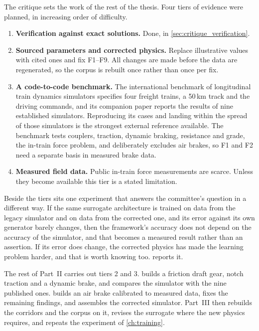 The critique sets the work of the rest of the thesis. Four tiers of evidence were planned, in increasing order of difficulty.

\begin{enumerate}
    \item \textbf{Verification against exact solutions.} Done, in \cref{sec:critique_verification}.
    \item \textbf{Sourced parameters and corrected physics.} Replace illustrative values with cited ones and fix F1--F9. All changes are made before the data are regenerated, so the corpus is rebuilt once rather than once per fix.
    \item \textbf{A code-to-code benchmark.} The international benchmark of longitudinal train dynamics simulators \cite{Spiryagin2017BenchmarkQuestions} specifies four freight trains, a 50\,km track and the driving commands, and its companion paper \cite{Wu2018BenchmarkResults} reports the results of nine established simulators. Reproducing its cases and landing within the spread of those simulators is the strongest external reference available. The benchmark tests couplers, traction, dynamic braking, resistance and grade, the in-train force problem, and deliberately excludes air brakes, so F1 and F2 need a separate basis in measured brake data.
    \item \textbf{Measured field data.} Public in-train force measurements are scarce. Unless they become available this tier is a stated limitation.
\end{enumerate}

Beside the tiers sits one experiment that answers the committee's question in a different way. If the same surrogate architecture is trained on data from the legacy simulator and on data from the corrected one, and its error against its own generator barely changes, then the framework's accuracy does not depend on the accuracy of the simulator, and that becomes a measured result rather than an assertion. If its error does change, the corrected physics has made the learning problem harder, and that is worth knowing too.  reports it.

The rest of Part~II carries out tiers 2 and 3.  builds a friction draft gear, notch traction and a dynamic brake, and compares the simulator with the nine published ones.  builds an air brake calibrated to measured data, fixes the remaining findings, and assembles the corrected simulator. Part~III then rebuilds the corridors and the corpus on it, revises the surrogate where the new physics requires, and repeats the experiment of \cref{ch:training}.


